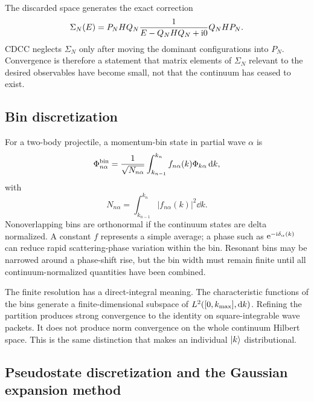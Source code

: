 The discarded space generates the exact correction
\begin{equation}
  \Sigma_N(E)=P_NHQ_N
  \frac{1}{E-Q_NHQ_N+\mathrm{i}0}
  Q_NHP_N.
  \label{eq:cdcc-discarded-selfenergy}
\end{equation}
CDCC neglects $\Sigma_N$ only after moving the dominant configurations into
$P_N$.  Convergence is therefore a statement that matrix elements of
$\Sigma_N$ relevant to the desired observables have become small, not that
the continuum has ceased to exist.

\subsection{Bin discretization}
\label{subsec:cdcc-bins}

For a two-body projectile, a momentum-bin state in partial wave $\alpha$ is
\begin{equation}
  \Phi_{n\alpha}^{\mathrm{bin}}
  =\frac{1}{\sqrt{N_{n\alpha}}}
  \int_{k_{n-1}}^{k_n}
  f_{n\alpha}(k)\Phi_{k\alpha}\,\mathrm{d} k,
  \label{eq:cdcc-bin-state}
\end{equation}
with
\begin{equation}
  N_{n\alpha}=
  \int_{k_{n-1}}^{k_n}|f_{n\alpha}(k)|^2\dd k.
  \label{eq:cdcc-bin-normalization}
\end{equation}
Nonoverlapping bins are orthonormal if the continuum states are delta
normalized.  A constant $f$ represents a simple average; a phase such as
$\mathrm{e}^{-\mathrm{i}\delta_\alpha(k)}$ can reduce rapid scattering-phase variation
within the bin.  Resonant bins may be narrowed around a phase-shift rise, but
the bin width must remain finite until all continuum-normalized quantities
have been combined.

The finite resolution has a direct-integral meaning.  The characteristic
functions of the bins generate a finite-dimensional subspace of
$L^2([0,k_{\max}],\mathrm{d} k)$.  Refining the partition produces strong
convergence to the identity on square-integrable wave packets.  It does not
produce norm convergence on the whole continuum Hilbert space.  This is the
same distinction that makes an individual $\lvert k \rangle$ distributional.

\subsection{Pseudostate discretization and the Gaussian expansion method}
\label{subsec:cdcc-pseudostates}

